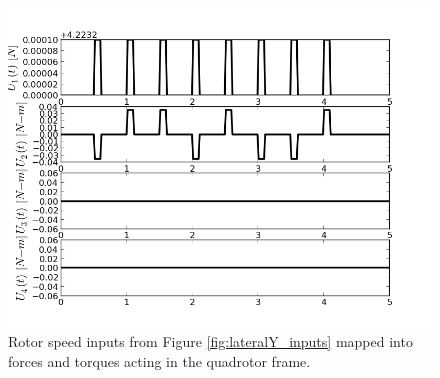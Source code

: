 \begin{figure}[H]
\centering
\includegraphics[scale=0.7]{Images/Chapter3/Lateral_Y/Torque_inputs.png}
\caption{Rotor speed inputs from Figure \ref{fig:lateralY_inputs} mapped into forces and torques acting in the quadrotor frame.}
\label{fig:lateralY_torqueinputs}
\end{figure}


